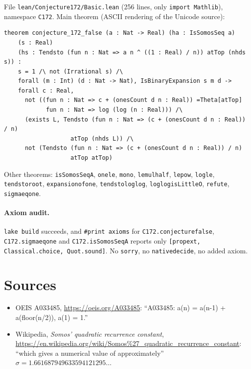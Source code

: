 \documentclass[11pt]{article}
\theoremstyle{definition}
\theoremstyle{remark}
\renewcommand{\_}{\oldus\allowbreak}
\begin{document}
File \texttt{lean/Conjecture172/Basic.lean} (256 lines, only \texttt{import Mathlib}), namespace
\texttt{C172}. Main theorem (ASCII rendering of the Unicode source):
\begin{verbatim}
theorem conjecture_172_false (a : Nat -> Real) (ha : IsSomosSeq a)
    (s : Real)
    (hs : Tendsto (fun n : Nat => a n ^ ((1 : Real) / n)) atTop (nhds s)) :
    s = 1 /\ not (Irrational s) /\
    forall (m : Int) (d : Nat -> Nat), IsBinaryExpansion s m d ->
    forall c : Real,
      not ((fun n : Nat => c + (onesCount d n : Real)) =Theta[atTop]
            fun n : Nat => log (log (n : Real))) /\
      (exists L, Tendsto (fun n : Nat => (c + (onesCount d n : Real)) / n)
                   atTop (nhds L)) /\
      not (Tendsto (fun n : Nat => (c + (onesCount d n : Real)) / n)
                   atTop atTop)
\end{verbatim}
Other theorems: \texttt{isSomosSeq\_A}, \texttt{one\_le}, \texttt{mono}, \texttt{le\_mul\_half},
\texttt{le\_pow}, \texttt{log\_le}, \texttt{tendsto\_root}, \texttt{expansion\_of\_one},
\texttt{tendsto\_loglog}, \texttt{loglog\_isLittleO}, \texttt{refute}, \texttt{sigma\_eq\_one}.

\paragraph{Axiom audit.} \texttt{lake build} succeeds, and \texttt{\#print axioms} for
\texttt{C172.conjecture\_172\_false}, \texttt{C172.sigma\_eq\_one} and \texttt{C172.isSomosSeq\_A}
reports only \texttt{[propext, Classical.choice, Quot.sound]}. No \texttt{sorry}, no
\texttt{native\_decide}, no added axiom.

\section*{Sources}
\begin{itemize}
\item OEIS A033485, \url{https://oeis.org/A033485}: ``A033485: a(n) = a(n-1) + a(floor(n/2)), a(1) = 1.''
\item Wikipedia, \emph{Somos' quadratic recurrence constant},
\url{https://en.wikipedia.org/wiki/Somos\%27_quadratic_recurrence_constant}: ``which gives a numerical value
of approximately'' $\sigma = 1.661687949633594121295\dots$
\end{itemize}
\end{document}

